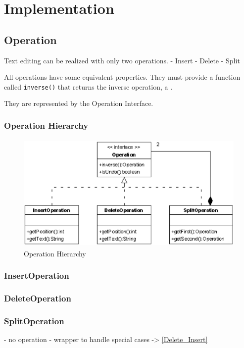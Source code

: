 
\chapter{Implementation}

\section{Operation}
Text editing can be realized with only two operations. 
 - Insert
 - Delete
 - Split

All operations have some equivalent properties. They must provide a function called \texttt{inverse()} that returns the inverse operation, a . 

They are represented by the Operation Interface.
 
\subsection{Operation Hierarchy}
\begin{figure}[H]
\centering
\includegraphics[height=5.74cm,width=11.59cm]{../../images/algo-impl/operation_classdiagram.eps}
\caption{Operation Hierarchy}
\label{Operation Hierarchy}
\end{figure}

\subsection{InsertOperation}


\subsection{DeleteOperation}
\subsection{SplitOperation}
\label{Split_Operation}
  - no operation
  - wrapper to handle special cases -> \ref{Delete_Insert}


